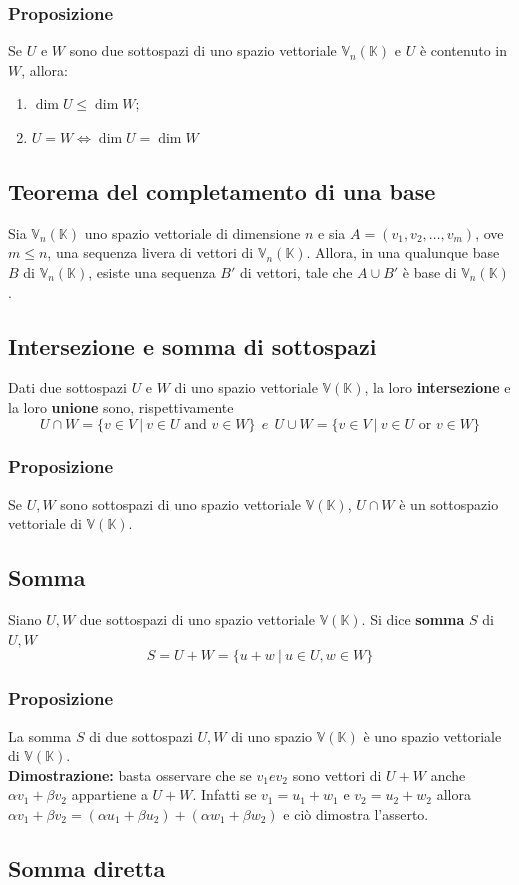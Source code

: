 \documentclass{article}
\newcommand{\V}{\mathbb{V} (\mathbb{K})}
\newcommand{\s}[2]{#1_1, #1_2, \ldots, #1_{#2}}
\newcommand{\Vx}[1]{\mathbb{V}_#1 (\mathbb{K})}
\newcommand{\ah}{\alpha}
\newcommand{\bh}{\beta}
\begin{document}
\subsubsection{Proposizione}
Se $U$ e $W$ sono due sottospazi di uno spazio vettoriale $\Vx{n}$ e $U$ è contenuto in $W$, allora:
\begin{enumerate}
    \item $\dim U\leq\dim W$;
    \item $U = W \iff \dim U = \dim W$
\end{enumerate}

\subsection{Teorema del completamento di una base}
Sia $\Vx{n}$ uno spazio vettoriale di dimensione $n$ e sia $A = (\s{v}{m})$, ove $m\leq n$, una sequenza livera di vettori di $\Vx{n}$. 
Allora, in una qualunque base $B$ di $\Vx{n}$, esiste una sequenza $B'$ di vettori, tale che $A\cup B'$ è base di $\Vx{n}$.

\subsection{Intersezione e somma di sottospazi}
Dati due sottospazi $U$ e $W$ di uno spazio vettoriale $\V$, la loro \textbf{intersezione} e la loro \textbf{unione} sono, rispettivamente
\[
    U \cap W = \{v\in V \ | \ v\in U \text{ and } v\in W  \} \ \ e \ \ U \cup W = \{v\in V \ | \ v\in U \text{ or } v\in W  \}
\]

\subsubsection{Proposizione}
Se $U, W$ sono sottospazi di uno spazio vettoriale $\V$, $U\cap W$ è un sottospazio vettoriale di $\V$.

\subsection{Somma}
Siano $U, W$ due sottospazi di uno spazio vettoriale $\V$. Si dice \textbf{somma} $S$ di $U, W$
\[
    S = U + W = \{u+w \ | \ u \in U,w\in W\}    
\]
\subsubsection{Proposizione}
La somma $S$ di due sottospazi $U, W$ di uno spazio $\V$ è uno spazio vettoriale di $\V$.\\
\textbf{Dimostrazione:} basta osservare che se $v_1 e v_2$ sono vettori di $U+W$ anche $\ah v_1+\bh v_2$ appartiene a $U+W$.
Infatti se $v_1 = u_1+w_1$ e $v_2 = u_2 + w_2$ allora $\ah v_1 + \bh v_2 = (\ah u_1 + \bh u_2)+(\ah w_1 + \bh w_2)$ e ciò dimostra l'asserto.

\subsection{Somma diretta}
\end{document}
